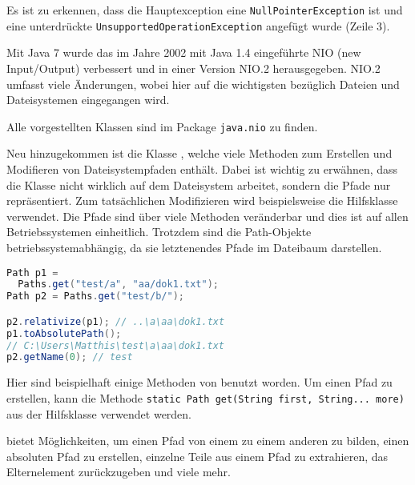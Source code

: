\documentclass[times, 10pt,twocolumn]{article}
\begin{document}
Es ist zu erkennen, dass die Hauptexception eine \texttt{NullPointerException} ist und eine unterdrückte 
\texttt{UnsupportedOperationException} angefügt wurde (Zeile 3).

Mit Java 7 wurde das im Jahre 2002 mit Java 1.4 eingeführte NIO (new Input/Output) verbessert und in einer Version NIO.2
herausgegeben.\cite{v2bJava7} NIO.2 umfasst viele Änderungen, wobei hier auf die wichtigsten bezüglich Dateien und
Dateisystemen eingegangen wird.

Alle vorgestellten Klassen sind im Package \texttt{java.nio} zu finden.

Neu hinzugekommen ist die Klasse , welche viele Methoden zum Erstellen und Modifieren von Dateisystempfaden enthält. Dabei ist
wichtig zu erwähnen, dass die Klasse nicht wirklich auf dem Dateisystem arbeitet, sondern die Pfade nur repräsentiert. Zum tatsächlichen
Modifizieren wird beispielsweise die Hilfsklasse  verwendet. Die Pfade sind über viele Methoden veränderbar und dies ist auf
allen Betriebssystemen einheitlich. Trotzdem sind die Path-Objekte betriebssystemabhängig, da sie letztenendes Pfade 
im Dateibaum darstellen.
\begin{lstlisting}[language=java,breaklines=true]
Path p1 = 
  Paths.get("test/a", "aa/dok1.txt");
Path p2 = Paths.get("test/b/");

p2.relativize(p1); // ..\a\aa\dok1.txt
p1.toAbsolutePath(); 
// C:\Users\Matthis\test\a\aa\dok1.txt
p2.getName(0); // test
\end{lstlisting}
Hier sind beispielhaft einige Methoden von  benutzt worden. Um einen Pfad zu erstellen, kann die 
Methode \texttt{static Path get(String first, String... more)} aus der Hilfsklasse  verwendet werden.

 bietet Möglichkeiten, um einen Pfad von einem zu einem anderen zu bilden, einen absoluten Pfad zu erstellen,
einzelne Teile aus einem Pfad zu extrahieren, das Elternelement zurückzugeben und viele mehr.
\end{document}
